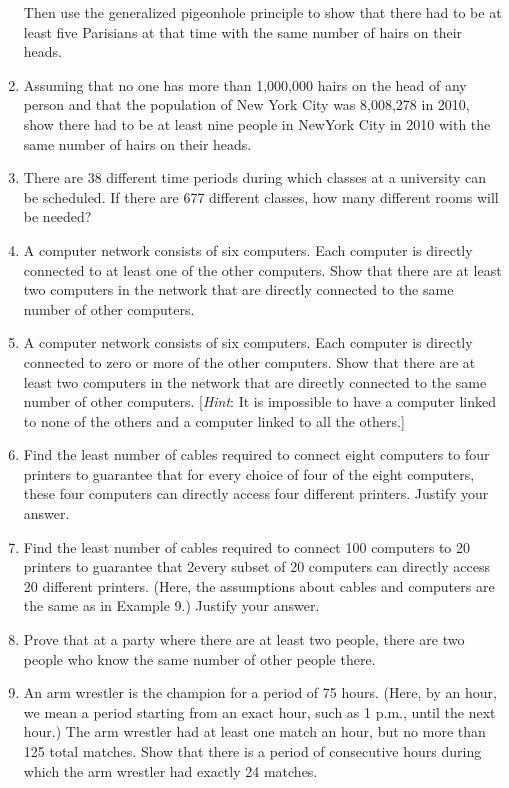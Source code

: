 \documentclass[11pt,a4paper]{book}
\newcommand{\onestaritem}{\refstepcounter{enumi}\item[$*$\theenumi.]}
\begin{document}
\begin{enumerate}
Then use the generalized pigeonhole principle to show that there had to be at least five Parisians at that time with the same number of hairs on their heads.
\item Assuming that no one has more than 1,000,000 hairs on the head of any person and that the population of New York City was 8,008,278 in 2010, show there had to be at least nine people in NewYork City in 2010 with the same number of hairs on their heads.
\item There are 38 different time periods during which classes at a university can be scheduled.
If there are 677 different classes, how many different rooms will be needed?
\item A computer network consists of six computers.
Each computer is directly connected to at least one of the other computers.
Show that there are at least two computers in the network that are directly connected to the same number of other computers.
\item A computer network consists of six computers.
Each computer is directly connected to zero or more of the other computers.
Show that there are at least two computers in the network that are directly connected to the same number of other computers. [\textit{Hint}: It is impossible to have a computer linked to none of the others and a computer linked to all the others.]
\item Find the least number of cables required to connect eight computers to four printers to guarantee that for every choice of four of the eight computers, these four computers can directly access four different printers.
Justify your answer.
\item Find the least number of cables required to connect 100 computers to 20 printers to guarantee that 2every subset of 20 computers can directly access 20 different printers. (Here, the assumptions about cables and computers are the same as in Example 9.)
Justify your answer.
\onestaritem Prove that at a party where there are at least two people, there are two people who know the same number of other people there.
\item An arm wrestler is the champion for a period of 75 hours. (Here, by an hour, we mean a period starting from an exact hour, such as 1 p.m., until the next hour.)
The arm wrestler had at least one match an hour, but no more than 125 total matches.
Show that there is a period of consecutive hours during which the arm wrestler had exactly 24 matches.

\end{enumerate}
\end{document}
